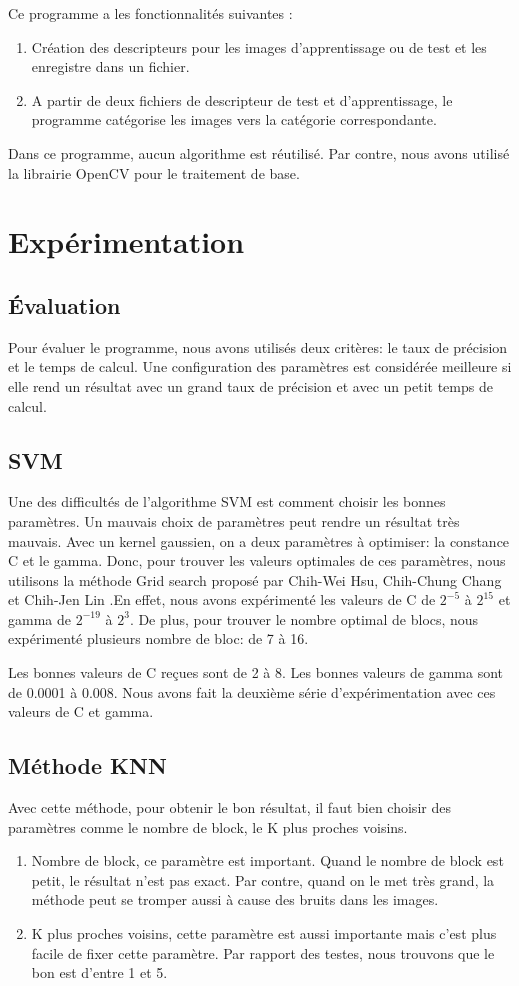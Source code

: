 \documentclass[]{article}   %
\begin{document}
Ce programme a les fonctionnalités suivantes :
\begin{enumerate}
\item Création des descripteurs pour les images d'apprentissage ou de test et les enregistre dans un fichier.
\item A partir de deux fichiers de descripteur de test et d'apprentissage, le programme catégorise les images vers la catégorie correspondante.
\end{enumerate}

Dans ce programme, aucun algorithme est réutilisé. Par contre, nous avons utilisé la librairie OpenCV pour le traitement de base.
\section{Expérimentation}
\subsection{Évaluation}
Pour évaluer le programme, nous avons utilisés deux critères: le taux de précision et le 
temps de calcul. Une configuration des paramètres est considérée meilleure si elle rend 
un résultat avec un grand taux de précision et avec un petit temps de calcul.

\subsection{SVM}
Une des difficultés de l'algorithme SVM est comment choisir les bonnes paramètres. 
Un mauvais choix de paramètres peut rendre un résultat très mauvais. Avec un kernel 
gaussien, on a deux paramètres à optimiser: la constance C et le gamma. Donc, pour 
trouver les valeurs optimales de ces paramètres, nous utilisons la méthode Grid search 
proposé par Chih-Wei Hsu, Chih-Chung Chang et Chih-Jen Lin \cite{c2}.En effet, nous avons 
expérimenté les valeurs de C de $2^{-5}$ à $2^{15}$ et gamma de $2^{-19}$ à $2^3$. De 
plus, pour trouver le nombre optimal de blocs, nous expérimenté plusieurs nombre de bloc:
de 7 à 16.

Les bonnes valeurs de C reçues sont de 2 à 8. Les bonnes valeurs de gamma sont de 0.0001 
à 0.008. Nous avons fait la deuxième série d'expérimentation avec ces valeurs de C et 
gamma.

\subsection{Méthode KNN}
Avec cette méthode, pour obtenir le bon résultat, il faut bien choisir des paramètres 
comme le nombre de block, le K plus proches voisins.
\begin{enumerate}
\item Nombre de block, ce paramètre est important. Quand le nombre de block est petit, le 
résultat n'est pas exact. Par contre, quand on le met très grand, la méthode peut se 
tromper aussi à cause des bruits dans les images.
\item K plus proches voisins, cette paramètre est aussi importante mais c'est plus facile 
de fixer cette paramètre. Par rapport des testes, nous trouvons que le bon est d'entre 1 
et 5.
\end{enumerate}
\end{document}
